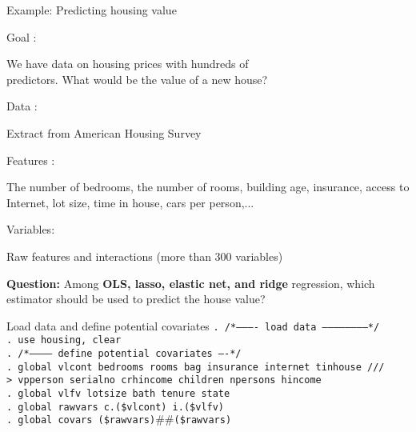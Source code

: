 \documentclass{beamer}
\newcommand{\st}[1]{\small{\texttt{#1}}}
\begin{document}
\begin{frame}{Example: Predicting housing value}
	
	{\color{blue}Goal :}
	\begin{minipage}[t]{0.8\linewidth}
		We have data on housing prices with hundreds of \\predictors. What would be the value of a new house?\\
	\end{minipage}

	{\color{blue}Data :}
	\begin{minipage}[t]{0.8\linewidth}
		Extract from American Housing Survey\\
	\end{minipage}
	
	{\color{blue}Features :}
	\begin{minipage}[t]{0.8\linewidth}
		The number of bedrooms, the number of rooms, building age, insurance, access to Internet, lot size, time in house, cars per person,...\\
	\end{minipage}
	
	{\color{blue}Variables:}
	\begin{minipage}[t]{0.8\linewidth}
		Raw features and interactions (more than 300 variables)\\
	\end{minipage}

\textbf{Question:} Among \textbf{OLS, lasso, elastic net, and ridge} regression, which estimator should be used to predict the house value?
\end{frame}

\begin{frame}{Load data and define potential covariates}
\st{. /*---------- load data ------------------------*/}\\
\st{. use housing, clear}\\
\st{. /*----------- define potential covariates ----*/}\\
\st{. global vlcont bedrooms rooms bag insurance internet tinhouse    ///}\\
\st{>         vpperson serialno crhincome children npersons hincome}\\
\st{. global vlfv lotsize bath tenure state}\\
\st{. global rawvars c.(\$vlcont) i.(\$vlfv)}\\
\st{. global covars (\$rawvars)$\#\#$(\$rawvars)}\\
\end{frame}
\end{document}
